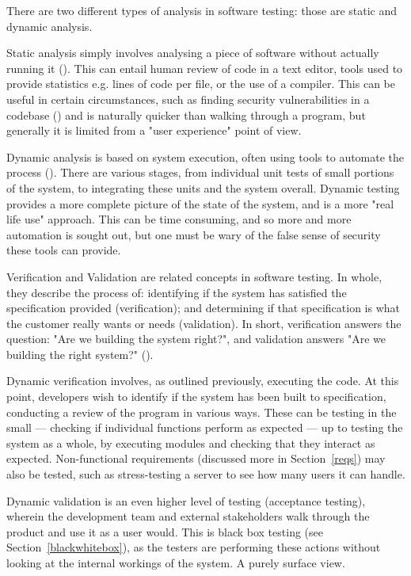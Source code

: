 \documentclass[12pt]{article}
\begin{document}
There are two different types of analysis in software testing: those are static and dynamic analysis. 

Static analysis simply involves analysing a piece of software without actually running it (). This can entail human review of code in a text editor, tools used to provide statistics e.g. lines of code per file, or the use of a compiler. This can be useful in certain circumstances, such as finding security vulnerabilities in a codebase () and is naturally quicker than walking through a program, but generally it is limited from a "user experience" point of view.

Dynamic analysis is based on system execution, often using tools to automate the process (). There are various stages, from individual unit tests of small portions of the system, to integrating these units and the system overall. Dynamic testing provides a more complete picture of the state of the system, and is a more "real life use" approach. This can be time consuming, and so more and more automation is sought out, but one must be wary of the false sense of security these tools can provide.

Verification and Validation are related concepts in software testing. In whole, they describe the process of: identifying if the system has satisfied the specification provided (verification); and determining if that specification is what the customer really wants or needs (validation). In short, verification answers the question: "Are we building the system right?", and validation answers "Are we building the right system?" (). 

Dynamic verification involves, as outlined previously, executing the code. At this point, developers wish to identify if the system has been built to specification, conducting a review of the program in various ways. These can be testing in the small --- checking if individual functions perform as expected --- up to testing the system as a whole, by executing modules and checking that they interact as expected. Non-functional requirements (discussed more in Section~\ref{reqs}) may also be tested, such as stress-testing a server to see how many users it can handle.

Dynamic validation is an even higher level of testing (acceptance testing), wherein the development team and external stakeholders walk through the product and use it as a user would. This is black box testing (see Section~\ref{blackwhitebox}), as the testers are performing these actions without looking at the internal workings of the system. A purely surface view.
\end{document}
